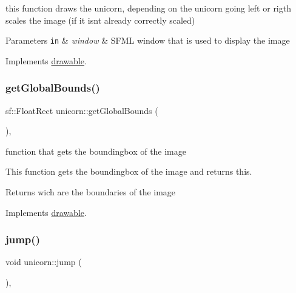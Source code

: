 this function draws the unicorn, depending on the unicorn going left or rigth scales the image (if it isn\textquotesingle{}t already correctly scaled)


\begin{DoxyParams}[1]{Parameters}
\mbox{\tt in}  & {\em window} & S\+F\+ML window that is used to display the image \\
\hline
\end{DoxyParams}


Implements \hyperlink{classdrawable_a4e49e2c1121704c83ce24c5f48dd910f}{drawable}.

\mbox{\label{classunicorn_a1bac09fc59b04f14f5a093bc4daa04da}} 
\subsubsection{\texorpdfstring{get\+Global\+Bounds()}{getGlobalBounds()}}
{\footnotesize\ttfamily sf\+::\+Float\+Rect unicorn\+::get\+Global\+Bounds (\begin{DoxyParamCaption}{ }\end{DoxyParamCaption})\hspace{0.3cm}{\ttfamily [override]}, {\ttfamily [virtual]}}



function that gets the boundingbox of the image 

This function gets the boundingbox of the image and returns this.

\begin{DoxyReturn}{Returns}
wich are the boundaries of the image 
\end{DoxyReturn}


Implements \hyperlink{classdrawable_ae013ac0be47538be9ce885d6642daf73}{drawable}.

\mbox{\label{classunicorn_a07d5ca4e66632c0e871221a27146805a}} 
\subsubsection{\texorpdfstring{jump()}{jump()}}
{\footnotesize\ttfamily void unicorn\+::jump (\begin{DoxyParamCaption}{ }\end{DoxyParamCaption})\hspace{0.3cm}{\ttfamily [override]}, {\ttfamily [virtual]}}



